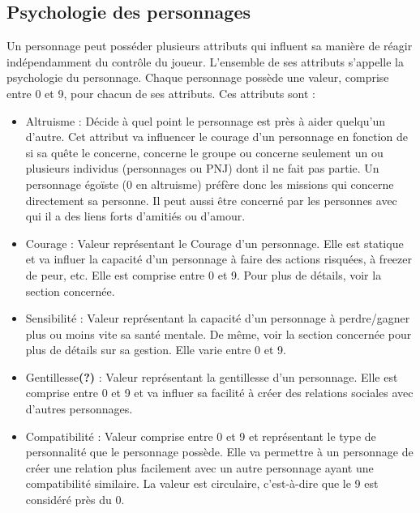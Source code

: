 \subsection{Psychologie des personnages}
Un personnage peut posséder plusieurs attributs qui influent sa manière de réagir indépendamment du contrôle du joueur. L'ensemble de ses attributs s'appelle la psychologie du personnage. Chaque personnage possède une valeur, comprise entre 0 et 9, pour chacun de ses attributs. Ces attributs sont :
\begin{itemize}
  \item Altruisme : Décide à quel point le personnage est près à aider quelqu'un d'autre. Cet attribut va influencer le courage d'un personnage en fonction de si sa quête le concerne, concerne le groupe ou concerne seulement un ou plusieurs individus (personnages ou PNJ) dont il ne fait pas partie. Un personnage égoïste (0 en altruisme) préfère donc les missions qui concerne directement sa personne. Il peut aussi être concerné par les personnes avec qui il a des liens forts d'amitiés ou d'amour. 
  \item Courage : Valeur représentant le Courage d'un personnage. Elle est statique et va influer la capacité d'un personnage à faire des actions risquées, à freezer de peur, etc. Elle est comprise entre 0 et 9. Pour plus de détails, voir la section concernée.
  \item Sensibilité : Valeur représentant la capacité d'un personnage à perdre/gagner plus ou moins vite sa santé mentale. De même, voir la section concernée pour plus de détails sur sa gestion. Elle varie entre 0 et 9.
  \item Gentillesse\textbf{(?)} : Valeur représentant la gentillesse d'un personnage. Elle est comprise entre 0 et 9 et va influer sa facilité à créer des relations sociales avec d'autres personnages.
  \item Compatibilité : Valeur comprise entre 0 et 9 et représentant le type de personnalité que le personnage possède. Elle va permettre à un personnage de créer une relation plus facilement avec un autre personnage ayant une compatibilité similaire. La valeur est circulaire, c'est-à-dire que le 9 est considéré près du 0.
\end{itemize} 

